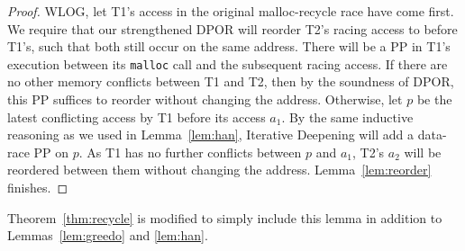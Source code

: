 \begin{proof}
WLOG, let T1's access in the original malloc-recycle race have come first.
We require that our strengthened DPOR will reorder T2's racing access to before T1's, such that both still occur on the same address.
There will be a PP in T1's execution between its {\tt malloc} call and the subsequent racing access.
If there are no other memory conflicts between T1 and T2, then by the soundness of DPOR, this PP suffices to reorder without changing the address.
Otherwise, let $p$ be the latest conflicting access by T1 before its access $a_1$.
By the same inductive reasoning as we used in Lemma~\ref{lem:han}, Iterative Deepening will add a data-race PP on $p$.
As T1 has no further conflicts between $p$ and $a_1$, T2's $a_2$ will be reordered between them without changing the address.
Lemma~\ref{lem:reorder} finishes.
\end{proof}

Theorem~\ref{thm:recycle} is modified to simply include this lemma in addition to Lemmas~\ref{lem:greedo} and \ref{lem:han}.

%
